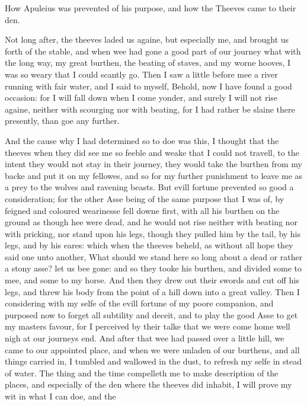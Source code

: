 
How Apuleius was prevented of his purpose, and how the Theeves came to their
den.

Not long after, the theeves laded us againe, but especially me, and brought us
forth of the stable, and when wee had gone a good part of our journey what with
the long way, my great burthen, the beating of staves, and my worne hooves, I
was so weary that I could scantly go. Then I saw a little before mee a river
running with fair water, and I said to myself, Behold, now I have found a good
occasion: for I will fall down when I come yonder, and surely I will not rise
againe, neither with scourging nor with beating, for I had rather be slaine
there presently, than goe any further.

And the cause why I had determined so to doe was this, I thought that the
theeves when they did see me so feeble and weake that I could not travell, to
the intent they would not stay in their journey, they would take the burthen
from my backe and put it on my fellowes, and so for my further punishment to
leave me as a prey to the wolves and ravening beasts. But evill fortune
prevented so good a consideration; for the other Asse being of the same purpose
that I was of, by feigned and coloured wearinesse fell downe first, with all
his burthen on the ground as though hee were dead, and he would not rise
neither with beating nor with pricking, nor stand upon his legs, though they
pulled him by the tail, by his legs, and by his eares: which when the theeves
beheld, as without all hope they said one unto another, What should we stand
here so long about a dead or rather a stony asse? let us bee gone: and so they
tooke his burthen, and divided some to mee, and some to my horse. And then they
drew out their swords and cut off his legs, and threw his body from the point
of a hill down into a great valley. Then I considering with my selfe of the
evill fortune of my poore companion, and purposed now to forget all subtility
and deceit, and to play the good Asse to get my masters favour, for I perceived
by their talke that we were come home well nigh at our journeys end. And after
that wee had passed over a little hill, we came to our appointed place, and
when we were unladen of our burthens, and all things carried in, I tumbled and
wallowed in the dust, to refresh my selfe in stead of water. The thing and the
time compelleth me to make description of the places, and especially of the den
where the theeves did inhabit, I will prove my wit in what I can doe, and the

